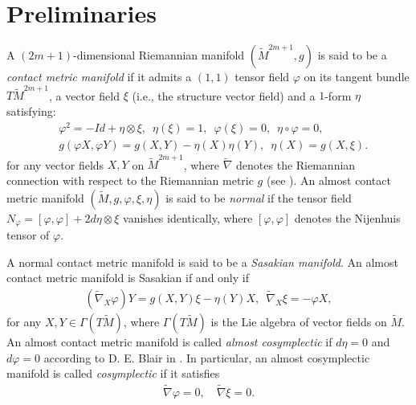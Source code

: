 \documentclass[reqno]{amsart}
\theoremstyle{plain}
\theoremstyle{remark}
\numberwithin{equation}{section}
\begin{document}




\section{Preliminaries}\label{S2}

A $(2m+1)$-dimensional Riemannian  manifold $(\widetilde M^{2m+1}, g)$ is said to be a {\it{contact metric manifold}} if it admits a $(1, 1)$ tensor field $\varphi$ on its tangent bundle $T\widetilde M^{2m+1}$, a vector field ${\mathfrak{\xi}}$ (i.e., the structure  vector field) and a $1$-form $\eta$ satisfying:
\begin{equation}\begin{aligned}\label{struc}
&\varphi^2=-Id+\eta\otimes{\mathfrak{\xi}},\,\,\,\eta({\mathfrak{\xi}})=1,\,\,\,\varphi(\xi)=0,\,\,\,\eta\circ\varphi=0,\\
&g(\varphi X, \varphi Y)=g(X, Y)-\eta(X)\eta(Y),\,\,\,\eta(X)=g(X, {\mathfrak{\xi}}).
\end{aligned}\end{equation}
for any vector fields $X, Y$ on $\widetilde M^{2m+1}$, where $\widetilde\nabla$ denotes the Riemannian connection with respect to the Riemannian metric $g$ (see \cite{Bl}). An almost contact metric manifold $(\widetilde M, g, \varphi, \xi, \eta)$ is said to be {\textit{normal}} if the tensor field $N_{\varphi}=[\varphi, \varphi]+2d\eta\otimes\xi$ vanishes identically, where $[\varphi, \varphi]$ denotes the Nijenhuis tensor of $\varphi$. 

A normal contact metric manifold is said to be a {\textit{Sasakian manifold}}. An almost contact metric manifold is Sasakian if and only if
\begin{align}\label{sasaki}
(\widetilde\nabla_X\varphi)Y=g(X, Y){\mathfrak{\xi}}-\eta(Y)X,\,\,\,\widetilde\nabla_X{\mathfrak{\xi}}=-\varphi X,
\end{align}
for any $X, Y\in\Gamma(T\widetilde M)$, where $\Gamma(T\widetilde M)$ is the Lie algebra of vector fields on $\widetilde M$.
An almost contact metric manifold is called {\em{almost cosymplectic}}  if $d\eta=0$ and $d\varphi=0$ according to D. E. Blair in \cite{Bl}. In particular, an almost cosymplectic manifold is called {\em{cosymplectic}} if it satisfies
\begin{align}\label{cosy}
\widetilde\nabla\varphi=0,\quad
\widetilde\nabla\xi=0.
\end{align}
\end{document}

